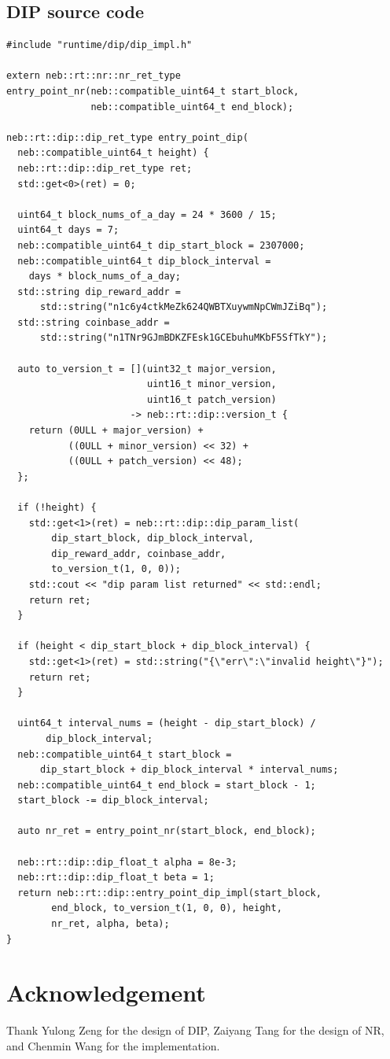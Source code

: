 \documentclass[11pt]{article}
\begin{document}
\subsection{DIP source code}
\begin{lstlisting}
#include "runtime/dip/dip_impl.h"

extern neb::rt::nr::nr_ret_type
entry_point_nr(neb::compatible_uint64_t start_block,
               neb::compatible_uint64_t end_block);

neb::rt::dip::dip_ret_type entry_point_dip(
  neb::compatible_uint64_t height) {
  neb::rt::dip::dip_ret_type ret;
  std::get<0>(ret) = 0;

  uint64_t block_nums_of_a_day = 24 * 3600 / 15;
  uint64_t days = 7;
  neb::compatible_uint64_t dip_start_block = 2307000;
  neb::compatible_uint64_t dip_block_interval =
    days * block_nums_of_a_day;
  std::string dip_reward_addr =
      std::string("n1c6y4ctkMeZk624QWBTXuywmNpCWmJZiBq");
  std::string coinbase_addr =
      std::string("n1TNr9GJmBDKZFEsk1GCEbuhuMKbF5SfTkY");

  auto to_version_t = [](uint32_t major_version,
                         uint16_t minor_version,
                         uint16_t patch_version)
                      -> neb::rt::dip::version_t {
    return (0ULL + major_version) +
           ((0ULL + minor_version) << 32) +
           ((0ULL + patch_version) << 48);
  };

  if (!height) {
    std::get<1>(ret) = neb::rt::dip::dip_param_list(
        dip_start_block, dip_block_interval,
        dip_reward_addr, coinbase_addr,
        to_version_t(1, 0, 0));
    std::cout << "dip param list returned" << std::endl;
    return ret;
  }

  if (height < dip_start_block + dip_block_interval) {
    std::get<1>(ret) = std::string("{\"err\":\"invalid height\"}");
    return ret;
  }

  uint64_t interval_nums = (height - dip_start_block) /
       dip_block_interval;
  neb::compatible_uint64_t start_block =
      dip_start_block + dip_block_interval * interval_nums;
  neb::compatible_uint64_t end_block = start_block - 1;
  start_block -= dip_block_interval;

  auto nr_ret = entry_point_nr(start_block, end_block);

  neb::rt::dip::dip_float_t alpha = 8e-3;
  neb::rt::dip::dip_float_t beta = 1;
  return neb::rt::dip::entry_point_dip_impl(start_block,
        end_block, to_version_t(1, 0, 0), height,
        nr_ret, alpha, beta);
}
\end{lstlisting}


\section{Acknowledgement}
Thank Yulong Zeng for the design of DIP, Zaiyang Tang for the design of NR, and
Chenmin Wang for the implementation.
\end{document}
